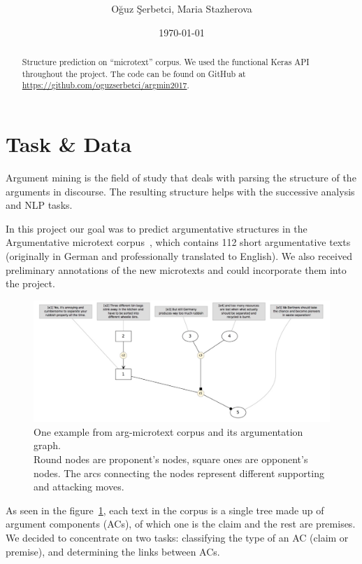 \documentclass[onecolumn]{article}
\title{\spacecaps{Project module report: Argumentation Mining }\\
       \normalsize\spacesc{University of Potsdam, Winter semester 2017/18}}
\author{Oğuz Şerbetci, Maria Stazherova}
\date{\today}
\begin{document}
\maketitle

\begin{abstract}

Structure prediction on ``microtext'' corpus. We used the functional Keras API throughout the project. The code can be found on GitHub at \url{https://github.com/oguzserbetci/argmin2017}.

\end{abstract}


\section{Task \& Data}
Argument mining is the field of study that deals with parsing the structure of the arguments in discourse. The resulting structure helps with the successive analysis and NLP tasks.

In this project our goal was to predict argumentative structures in the
Argumentative microtext corpus~\cite{peldszus2015annotated}, which contains 112 short argumentative texts
(originally in German and professionally translated to English).
We also received preliminary annotations of the new microtexts
and could incorporate them into the project.

\begin{figure}[h]
    \centering
    \includegraphics[width=0.8\linewidth]{fig/microtext.jpg}
    \caption{One example from arg-microtext corpus and its argumentation graph.
            \\Round nodes are proponent's nodes, square ones are opponent's nodes.
            The arcs connecting the nodes represent different supporting and attacking moves.}\label{fig:microtext}
\end{figure}

As seen in the figure~\ref{fig:microtext}, each text in the corpus is a single tree made up of argument components (ACs), of which one is the claim and the rest are premises.
We decided to concentrate on two tasks: classifying the type of an AC (claim or premise), and determining the links between ACs.
\end{document}
